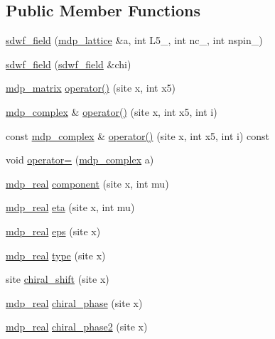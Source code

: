 \subsection*{Public Member Functions}
\begin{DoxyCompactItemize}
\item 
\hyperlink{classsdwf__field_a904cdf6c1f542aa5d4873b5c049a0de5}{sdwf\_\-field} (\hyperlink{classmdp__lattice}{mdp\_\-lattice} \&a, int L5\_\-, int nc\_\-, int nspin\_)
\item 
\hyperlink{classsdwf__field_af1438250ba08d632c4906ef99ad907ea}{sdwf\_\-field} (\hyperlink{classsdwf__field}{sdwf\_\-field} \&chi)
\item 
\hyperlink{classmdp__matrix}{mdp\_\-matrix} \hyperlink{classsdwf__field_a18764312ba3bb72577b2e29429854024}{operator()} (site x, int x5)
\item 
\hyperlink{classmdp__complex}{mdp\_\-complex} \& \hyperlink{classsdwf__field_a1cd68e8911b77c60ecd6a1cd245ec047}{operator()} (site x, int x5, int i)
\item 
const \hyperlink{classmdp__complex}{mdp\_\-complex} \& \hyperlink{classsdwf__field_a205e5f728691c6bfe350335a477e42c7}{operator()} (site x, int x5, int i) const 
\item 
void \hyperlink{classsdwf__field_ac9bbccf6442b9f1a1a07b18fd2fe442c}{operator=} (\hyperlink{classmdp__complex}{mdp\_\-complex} a)
\item 
\hyperlink{mdp__global__vars_8h_a049e4c1d4e74d644878a42f9909463e4}{mdp\_\-real} \hyperlink{classsdwf__field_aa834c736322bef716cd0e31a391623d3}{component} (site x, int mu)
\item 
\hyperlink{mdp__global__vars_8h_a049e4c1d4e74d644878a42f9909463e4}{mdp\_\-real} \hyperlink{classsdwf__field_ae50c1b9db65cd8056ed9286bde99e791}{eta} (site x, int mu)
\item 
\hyperlink{mdp__global__vars_8h_a049e4c1d4e74d644878a42f9909463e4}{mdp\_\-real} \hyperlink{classsdwf__field_a3cc6aef9972ab5cceab9646578857db0}{eps} (site x)
\item 
\hyperlink{mdp__global__vars_8h_a049e4c1d4e74d644878a42f9909463e4}{mdp\_\-real} \hyperlink{classsdwf__field_a7227345aef0414528513479dad854568}{type} (site x)
\item 
site \hyperlink{classsdwf__field_a5cff8766c1891c6240c97d17c6bb63b9}{chiral\_\-shift} (site x)
\item 
\hyperlink{mdp__global__vars_8h_a049e4c1d4e74d644878a42f9909463e4}{mdp\_\-real} \hyperlink{classsdwf__field_a29fce204e377b7a190455e4faf0a2a0c}{chiral\_\-phase} (site x)
\item 
\hyperlink{mdp__global__vars_8h_a049e4c1d4e74d644878a42f9909463e4}{mdp\_\-real} \hyperlink{classsdwf__field_a67fe2a75323e3dcfce3675cce0bbb312}{chiral\_\-phase2} (site x)
\end{DoxyCompactItemize}
